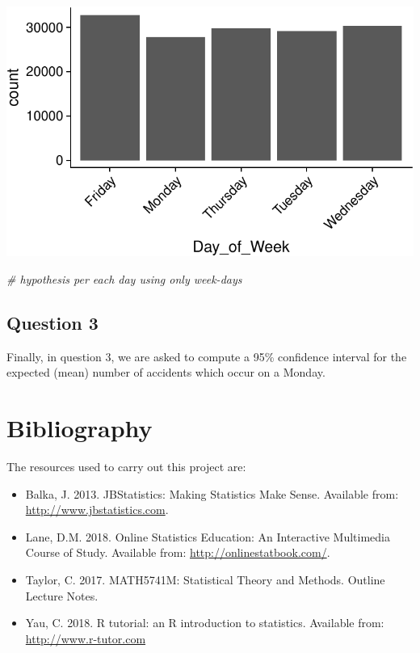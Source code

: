 \documentclass[]{article}
\newenvironment{Shaded}{\begin{snugshade}}{\end{snugshade}}
\newcommand{\KeywordTok}[1]{\textcolor[rgb]{0.13,0.29,0.53}{\textbf{{#1}}}}
\newcommand{\StringTok}[1]{\textcolor[rgb]{0.31,0.60,0.02}{{#1}}}
\newcommand{\CommentTok}[1]{\textcolor[rgb]{0.56,0.35,0.01}{\textit{{#1}}}}
\newcommand{\NormalTok}[1]{{#1}}
\providecommand{\tightlist}{%
  \setlength{\itemsep}{0pt}\setlength{\parskip}{0pt}}
\begin{document}
\includegraphics{READMEv2_files/figure-latex/unnamed-chunk-13-1.pdf}

\begin{Shaded}
\begin{Highlighting}[]
\CommentTok{# hypothesis per each day using only week-days}
\end{Highlighting}
\end{Shaded}

\subsection{Question 3}\label{question-3}

Finally, in question 3, we are asked to compute a 95\% confidence
interval for the expected (mean) number of accidents which occur on a
Monday.

\begin{Shaded}
\end{Shaded}

\section{Bibliography}\label{bibliography}

The resources used to carry out this project are:

\begin{itemize}
\tightlist
\item
  Balka, J. 2013. JBStatistics: Making Statistics Make Sense. Available
  from: \url{http://www.jbstatistics.com}.
\item
  Lane, D.M. 2018. Online Statistics Education: An Interactive
  Multimedia Course of Study. Available from:
  \url{http://onlinestatbook.com/}.
\item
  Taylor, C. 2017. MATH5741M: Statistical Theory and Methods. Outline
  Lecture Notes.
\item
  Yau, C. 2018. R tutorial: an R introduction to statistics. Available
  from: \url{http://www.r-tutor.com}
\end{itemize}
\end{document}
